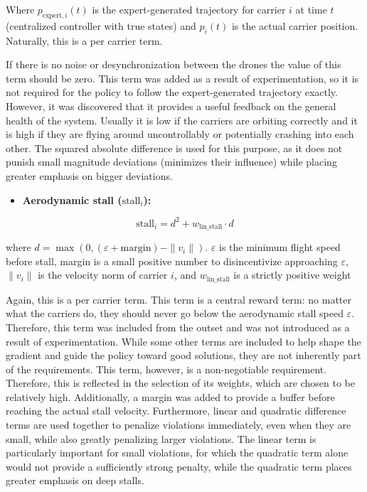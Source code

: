 Where $p_{\text{expert},i}(t)$ is the expert-generated trajectory for
carrier $i$ at time $t$ (centralized controller with true states) and
$p_i(t)$ is the actual carrier position. Naturally, this is a per
carrier term.

If there is no noise or desynchronization between the drones the value
of this term should be zero. This term was added as a result of
experimentation, so it is not required for the policy to follow the
expert-generated trajectory exactly. However, it was discovered that it
provides a useful feedback on the general health of the system. Usually
it is low if the carriers are orbiting correctly and it is high if they
are flying around uncontrollably or potentially crashing into each
other. The squared absolute difference is used for this purpose, as it
does not punish small magnitude deviations (minimizes their influence)
while placing greater emphasis on bigger deviations.

\begin{itemize}
  \item \textbf{Aerodynamic stall ($\text{stall}_i$):}
\end{itemize}

\begin{equation}
  \text{stall}_i = d^2 + w_{\text{lin\_stall}} \cdot d
  \label{eq:stall-term}
\end{equation}

where $d = \max(0, (\varepsilon + \text{margin}) - \|v_i\|)$.
$\varepsilon$ is the minimum flight speed before stall, margin is a
small positive number to disincentivize approaching $\varepsilon$,
$\|v_i\|$ is the velocity norm of carrier $i$, and $w_{\text{lin\_stall}}$
is a strictly positive weight

Again, this is a per carrier term. This term is a central reward term:
no matter what the carriers do, they should never go below the
aerodynamic stall speed $\varepsilon$. Therefore, this term was included
from the outset and was not introduced as a result of experimentation.
While some other terms are included to help shape the gradient and
guide the policy toward good solutions, they are not inherently part of
the requirements. This term, however, is a non-negotiable requirement.
Therefore, this is reflected in the selection of its weights, which are
chosen to be relatively high. Additionally, a margin was added to
provide a buffer before reaching the actual stall velocity.
Furthermore, linear and quadratic difference terms are used together to
penalize violations immediately, even when they are small, while also
greatly penalizing larger violations. The linear term is particularly
important for small violations, for which the quadratic term alone
would not provide a sufficiently strong penalty, while the quadratic
term places greater emphasis on deep stalls.

